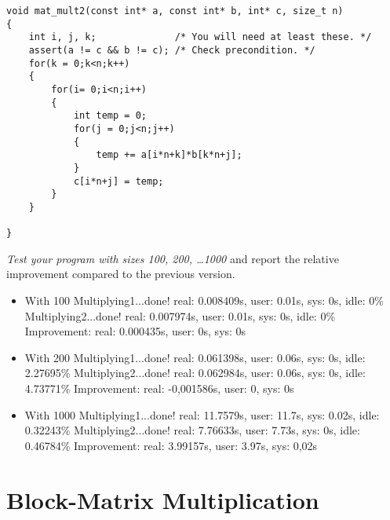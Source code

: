 \documentclass{article}
\begin{document}
\begin{ExerciseList}
\begin{lstlisting}
void mat_mult2(const int* a, const int* b, int* c, size_t n)
{
    int i, j, k;              /* You will need at least these. */
    assert(a != c && b != c); /* Check precondition. */
	for(k = 0;k<n;k++)
	{
		for(i= 0;i<n;i++)
		{
			int temp = 0;
			for(j = 0;j<n;j++)
			{
				temp += a[i*n+k]*b[k*n+j];
			}
			c[i*n+j] = temp;
		}
	}
	
}
\end{lstlisting}

\Question
\emph{Test your program with sizes 100, 200, \dots 1000} and report
the relative improvement compared to the previous version.
\Answer 
\begin{itemize}
\item With 100
\subitem Multiplying1...done!	real: 0.008409s, user: 0.01s, sys: 0s, idle: 0\%
\subitem Multiplying2...done!	real: 0.007974s, user: 0.01s, sys: 0s, idle: 0\%
\subitem Improvement: real: 0.000435s, user: 0s, sys: 0s
\item With 200
\subitem Multiplying1...done!	real: 0.061398s, user: 0.06s, sys: 0s, idle: 2.27695\%
\subitem Multiplying2...done!	real: 0.062984s, user: 0.06s, sys: 0s, idle: 4.73771\%
\subitem Improvement: real: -0,001586s, user: 0, sys: 0s
\item With 1000
\subitem Multiplying1...done!	real: 11.7579s, user: 11.7s, sys: 0.02s, idle: 0.32243\%
\subitem Multiplying2...done!	real: 7.76633s, user: 7.73s, sys: 0s, idle: 0.46784\%
\subitem Improvement: real: 3.99157s, user: 3.97s, sys: 0,02s
\end{itemize}

\end{ExerciseList}

\section{Block-Matrix Multiplication}
\end{document}
